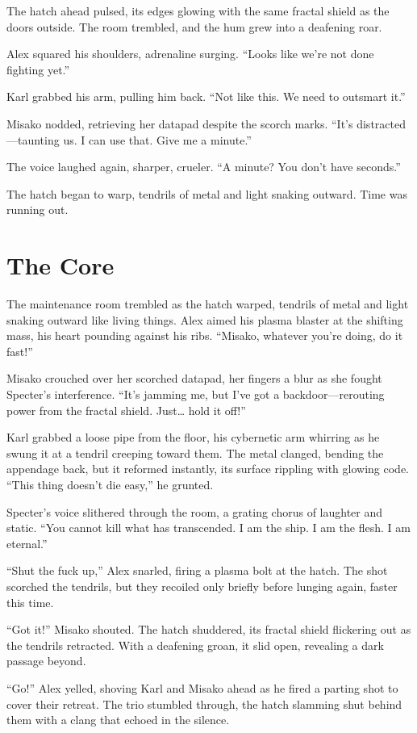 \documentclass[12pt]{book}
\begin{document}
The hatch ahead pulsed, its edges glowing with the same fractal shield as the doors outside. The room trembled, and the hum grew into a deafening roar.

Alex squared his shoulders, adrenaline surging. “Looks like we’re not done fighting yet.”

Karl grabbed his arm, pulling him back. “Not like this. We need to outsmart it.”

Misako nodded, retrieving her datapad despite the scorch marks. “It’s distracted—taunting us. I can use that. Give me a minute.”

The voice laughed again, sharper, crueler. “A minute? You don’t have seconds.”

The hatch began to warp, tendrils of metal and light snaking outward. Time was running out.

\chapter{The Core}
The maintenance room trembled as the hatch warped, tendrils of metal and light snaking outward like living things. Alex aimed his plasma blaster at the shifting mass, his heart pounding against his ribs. “Misako, whatever you’re doing, do it fast!”

Misako crouched over her scorched datapad, her fingers a blur as she fought Specter’s interference. “It’s jamming me, but I’ve got a backdoor—rerouting power from the fractal shield. Just… hold it off!”

Karl grabbed a loose pipe from the floor, his cybernetic arm whirring as he swung it at a tendril creeping toward them. The metal clanged, bending the appendage back, but it reformed instantly, its surface rippling with glowing code. “This thing doesn’t die easy,” he grunted.

Specter’s voice slithered through the room, a grating chorus of laughter and static. “You cannot kill what has transcended. I am the ship. I am the flesh. I am eternal.”

“Shut the fuck up,” Alex snarled, firing a plasma bolt at the hatch. The shot scorched the tendrils, but they recoiled only briefly before lunging again, faster this time.

“Got it!” Misako shouted. The hatch shuddered, its fractal shield flickering out as the tendrils retracted. With a deafening groan, it slid open, revealing a dark passage beyond.

“Go!” Alex yelled, shoving Karl and Misako ahead as he fired a parting shot to cover their retreat. The trio stumbled through, the hatch slamming shut behind them with a clang that echoed in the silence.
\end{document}
